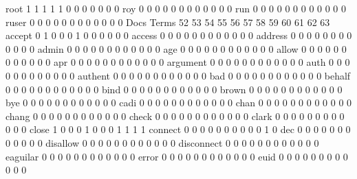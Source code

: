 \documentclass[compress,8pt]{beamer}
\begin{document}
\begin{frame}
\begin{Schunk}
  root                                      1  1  1  1  1  0  0  0  0  0  0  0
  roy                                       0  0  0  0  0  0  0  0  0  0  0  0
  run                                       0  0  0  0  0  0  0  0  0  0  0  0
  ruser                                     0  0  0  0  0  0  0  0  0  0  0  0
                                          Docs
Terms                                      52 53 54 55 56 57 58 59 60 61 62 63
  accept                                    0  1  0  0  0  1  0  0  0  0  0  0
  access                                    0  0  0  0  0  0  0  0  0  0  0  0
  address                                   0  0  0  0  0  0  0  0  0  0  0  0
  admin                                     0  0  0  0  0  0  0  0  0  0  0  0
  age                                       0  0  0  0  0  0  0  0  0  0  0  0
  allow                                     0  0  0  0  0  0  0  0  0  0  0  0
  apr                                       0  0  0  0  0  0  0  0  0  0  0  0
  argument                                  0  0  0  0  0  0  0  0  0  0  0  0
  auth                                      0  0  0  0  0  0  0  0  0  0  0  0
  authent                                   0  0  0  0  0  0  0  0  0  0  0  0
  bad                                       0  0  0  0  0  0  0  0  0  0  0  0
  behalf                                    0  0  0  0  0  0  0  0  0  0  0  0
  bind                                      0  0  0  0  0  0  0  0  0  0  0  0
  brown                                     0  0  0  0  0  0  0  0  0  0  0  0
  bye                                       0  0  0  0  0  0  0  0  0  0  0  0
  cadi                                      0  0  0  0  0  0  0  0  0  0  0  0
  chan                                      0  0  0  0  0  0  0  0  0  0  0  0
  chang                                     0  0  0  0  0  0  0  0  0  0  0  0
  check                                     0  0  0  0  0  0  0  0  0  0  0  0
  clark                                     0  0  0  0  0  0  0  0  0  0  0  0
  close                                     1  0  0  0  1  0  0  0  1  1  1  1
  connect                                   0  0  0  0  0  0  0  0  0  0  1  0
  dec                                       0  0  0  0  0  0  0  0  0  0  0  0
  disallow                                  0  0  0  0  0  0  0  0  0  0  0  0
  disconnect                                0  0  0  0  0  0  0  0  0  0  0  0
  eaguilar                                  0  0  0  0  0  0  0  0  0  0  0  0
  error                                     0  0  0  0  0  0  0  0  0  0  0  0
  euid                                      0  0  0  0  0  0  0  0  0  0  0  0

\end{Schunk}
\end{frame}
\end{document}
